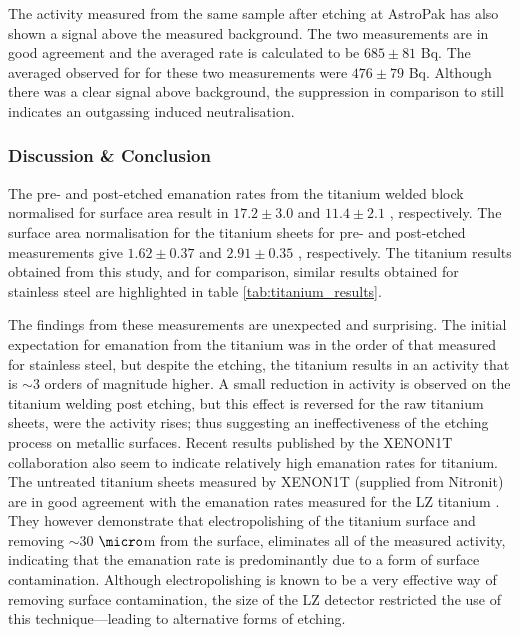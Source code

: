 The \PoTOF{} activity measured from the same sample after etching at AstroPak has also shown a signal above the measured background. The two measurements are in good agreement and the averaged rate is calculated to be $685\pm81$ \micro{}Bq. The averaged observed for \PoTOE{} for these two measurements were $476\pm79$ \micro{}Bq. Although there was a clear signal above background, the suppression in comparison to \PoTOF{} still indicates an outgassing induced neutralisation. 

\subsubsection{Discussion \& Conclusion}

The pre- and post-etched emanation rates from the titanium welded block normalised for surface area result in $17.2\pm3.0$ \mBqms and $11.4\pm2.1$ \mBqms, respectively. The surface area normalisation for the titanium sheets for pre- and post-etched measurements give $1.62\pm0.37$ \mBqms and $2.91\pm0.35$ \mBqms, respectively. The titanium results obtained from this study, and for comparison, similar results obtained for stainless steel are highlighted in table \ref{tab:titanium_results}.

The findings from these measurements are unexpected and surprising. The initial expectation for emanation from the titanium was in the order of that measured for stainless steel, but despite the etching, the titanium results in an activity that is $\sim3$ orders of magnitude higher. A small reduction in activity is observed on the titanium welding post etching, but this effect is reversed for the raw titanium sheets, were the activity rises; thus suggesting an ineffectiveness of the etching process on metallic surfaces. Recent results published by the XENON1T collaboration also seem to indicate relatively high emanation rates for titanium. The untreated titanium sheets measured by XENON1T (supplied from Nitronit) are in good agreement with the emanation rates measured for the LZ titanium \cite{Aprile:2020vmn}. They however demonstrate that electropolishing of the titanium surface and removing $\sim30$ $\micro$m from the surface, eliminates all of the measured activity, indicating that the emanation rate is predominantly due to a form of surface contamination. Although electropolishing is known to be a very effective way of removing surface contamination, the size of the LZ detector restricted the use of this technique---leading to alternative forms of etching. 

